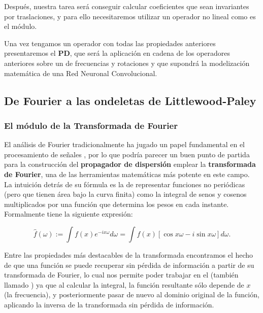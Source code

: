 \medskip

\noindent Después, nuestra tarea será conseguir calcular coeficientes que sean invariantes por traslaciones, y para ello necesitaremos utilizar un operador no lineal como es el módulo. 

\medskip

\noindent Una vez tengamos un operador con todas las propiedades anteriores presentaremos el \textbf{PD}, que será la aplicación en cadena de los operadores anteriores sobre un  de frecuencias y rotaciones y que supondrá la modelización matemática de una Red Neuronal Convolucional.



\subsection{De Fourier a las ondeletas de Littlewood-Paley}

\subsubsection{El módulo de la Transformada de Fourier}

\noindent El análisis de Fourier tradicionalmente ha jugado un papel fundamental en el procesamiento de señales \cite{DigitalImageProcessing}, por lo que podría parecer un buen punto de partida para la construcción del \textbf{propagador de dispersión} emplear la \textbf{transformada de Fourier}, una de las herramientas matemáticas más potente en este campo. La intuición detrás de su fórmula es la de representar funciones no periódicas (pero que tienen área bajo la curva finita) como la integral de senos y cosenos multiplicados por una función que determina los pesos en cada instante. Formalmente tiene la siguiente expresión:

$$\widehat{f}(\omega):= \int{f(x)e^{-ix\omega}d\omega}=\int{f(x)\left[\cos{x\omega} -i\sin{x\omega}\right]d\omega}.$$

\noindent Entre las propiedades más destacables de la transformada encontramos el hecho de que una función se puede recuperar sin pérdida de información a partir de su transformada de Fourier, lo cual nos permite poder trabajar en el  (también llamado ) ya que al calcular la integral, la función resultante sólo depende de $x$ (la frecuencia), y posteriormente pasar de nuevo al dominio original de la función, aplicando la inversa de la transformada sin pérdida de información.


